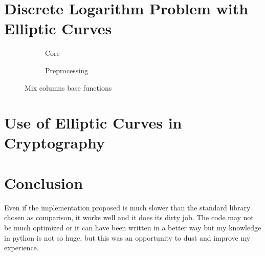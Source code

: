 \documentclass{article}
\begin{document}

\section{Discrete Logarithm Problem with Elliptic Curves}


\begin{figure}[H]
\centering
\begin{subfigure}{.54\textwidth}
  \centering
  \caption{Core}
  \label{fig:core}
\end{subfigure}
\begin{subfigure}{.35\textwidth}
  \centering
  \caption{Preprocessing}
  \label{fig:preprocessing}
\end{subfigure}
\caption{Mix columns base functions}
\label{fig:MixColumns}
\end{figure}
 

\section{Use of Elliptic Curves in Cryptography}



\section{Conclusion}

Even if the implementation proposed is much slower than the standard library chosen as comparison, it works well and it does its dirty job. The code may not be much optimized or it can have been written in a better way but my knowledge in python is not so huge, but this was an opportunity to dust and improve my experience.





%

\end{document}
